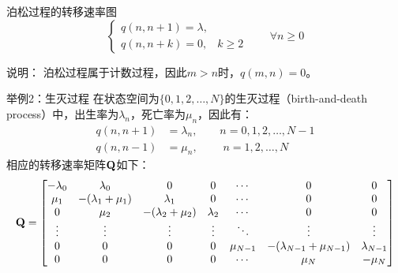 \documentclass[t]{beamer}
\begin{document}
\begin{frame}{泊松过程的转移速率图}
  \begin{equation*}
    \begin{cases}
    q(n,n+1)=\lambda,\\
    q(n,n+k)=0, & k\ge 2
    \end{cases}\qquad  \forall n\ge0
    \end{equation*}
  \centering

  \begin{block}{说明：}
泊松过程属于计数过程，因此$m>n$时，$q(m,n)=0$。
  \end{block}
\end{frame}

\begin{frame}{举例2：生灭过程}
  在状态空间为$\{0,1,2,\ldots,N\}$的生灭过程（birth-and-death process）中，出生率为$\lambda_n$，死亡率为$\mu_n$，因此有：
  \[\begin{split}
  q(n,n+1)&=\lambda_n, \qquad  n=0,1,2,\ldots, N-1\\
  q(n,n-1)&=\mu_n,\; \qquad n=1,2,\ldots, N
  \end{split} \]
  相应的转移速率矩阵${\bf Q}$如下：\small
  {\[{\bf Q}=\begin{bmatrix}
  -\lambda_0 & \lambda_0 & 0&0 &\cdots &0&0\\
  \mu_1& -(\lambda_1+\mu_1) & \lambda_1&0&\cdots &0&0\\
  0&\mu_2 & -(\lambda_2+\mu_2) &\lambda_2 &\cdots &0&0\\
  \vdots & \vdots &\vdots &\vdots &\ddots & \vdots&\vdots\\
  0&0&0&0&\mu_{N-1} &-(\lambda_{N-1}+\mu_{N-1})&\lambda_{N-1}\\
  0&0&0&0&\cdots& \mu_N &-\mu_N
  \end{bmatrix} \]}
\end{frame}
\end{document}
